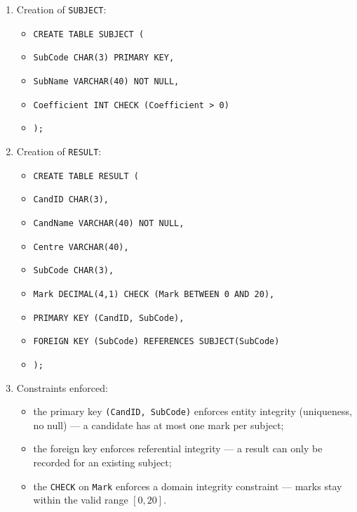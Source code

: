 \documentclass[11pt]{article}
\newcommand{\cle}[1]{{\popxbold\color{popdark}#1}}
\begin{document}
\begin{corrige}
\begin{enumerate}
\item Creation of \texttt{SUBJECT}:
\begin{itemize}
\item \texttt{CREATE TABLE SUBJECT (}
\item \texttt{\quad SubCode CHAR(3) PRIMARY KEY,}
\item \texttt{\quad SubName VARCHAR(40) NOT NULL,}
\item \texttt{\quad Coefficient INT CHECK (Coefficient > 0)}
\item \texttt{);}
\end{itemize}
\item Creation of \texttt{RESULT}:
\begin{itemize}
\item \texttt{CREATE TABLE RESULT (}
\item \texttt{\quad CandID CHAR(3),}
\item \texttt{\quad CandName VARCHAR(40) NOT NULL,}
\item \texttt{\quad Centre VARCHAR(40),}
\item \texttt{\quad SubCode CHAR(3),}
\item \texttt{\quad Mark DECIMAL(4,1) CHECK (Mark BETWEEN 0 AND 20),}
\item \texttt{\quad PRIMARY KEY (CandID, SubCode),}
\item \texttt{\quad FOREIGN KEY (SubCode) REFERENCES SUBJECT(SubCode)}
\item \texttt{);}
\end{itemize}
\item Constraints enforced:
\begin{itemize}
\item the primary key \texttt{(CandID, SubCode)} enforces \cle{entity integrity} (uniqueness, no null) — a candidate has at most one mark per subject;
\item the foreign key enforces \cle{referential integrity} — a result can only be recorded for an existing subject;
\item the \texttt{CHECK} on \texttt{Mark} enforces a \cle{domain integrity} constraint — marks stay within the valid range $[0, 20]$.
\end{itemize}
\end{enumerate}
\end{corrige}
\end{document}

